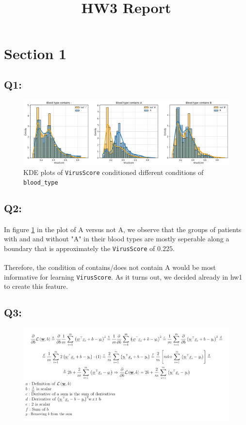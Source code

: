\documentclass{article}
\title{HW3 Report}
\date{}
\newcommand{\code}[1]{\texttt{#1}}
\begin{document}
\maketitle
\section*{Section 1}
\subsection*{Q1:}
    \begin{figure}[H]
        \centering
        \includegraphics[scale=0.5]{images/q1.png}
        \caption{KDE plots of \code{VirusScore} conditioned different conditions of \code{blood\_type}}
        \label{fig:q1}
    \end{figure}
\subsection*{Q2:}
    \paragraph*{}
    In figure \ref{fig:q1} in the plot of A versus not A, we observe that the groups of patients with and and without "A" in their blood types are mostly seperable along a boundary that is approximately the \code{VirusScore} of $0.225$. 
    \paragraph*{}
    Therefore, the condition of contains/does not contain A would be most informative for learning \code{VirusScore}.
    As it turns out, we decided already in hw1 to create this feature.
\subsection*{Q3:}
    \begin{figure}[H]
        \centering
        \includegraphics[scale=0.7]{images/q3.png}
    \end{figure}
\end{document}
